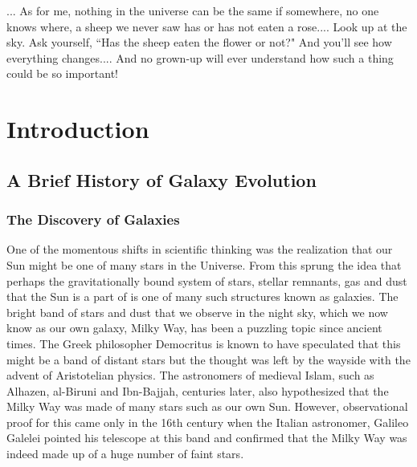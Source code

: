 \begin{savequote}[75mm]

... As for me, nothing in the universe can be the same if somewhere, no one knows where, a sheep we never saw has or has not eaten a rose....
Look up at the sky. Ask yourself, ``Has the sheep eaten the flower or not?" And you'll see how everything changes....
And no grown-up will ever understand how such a thing could be so important!
\end{savequote}


\chapter{Introduction}
\label{introduction}

\section{A Brief History of Galaxy Evolution}

\subsection{The Discovery of Galaxies}
One of the momentous shifts in scientific thinking was the realization that our Sun might be one of many stars in the Universe. From this sprung the idea that perhaps the gravitationally bound system of stars, stellar remnants, gas and dust that the Sun is a part of is one of many such structures known as galaxies. The bright band of stars and dust that we observe in the night sky, which we now know as our own galaxy, Milky Way, has been a puzzling topic since ancient times. The Greek philosopher Democritus is known to have speculated that this might be a band of distant stars but the thought was left by the wayside with the advent of Aristotelian physics. The astronomers of medieval Islam, such as Alhazen, al-Biruni and Ibn-Bajjah, centuries later, also hypothesized that the Milky Way was made of many stars such as our own Sun. However, observational proof for this came only in the 16th century when the Italian astronomer, Galileo Galelei pointed his telescope at this band and confirmed that the Milky Way was indeed made up of a huge number of faint stars.\\

